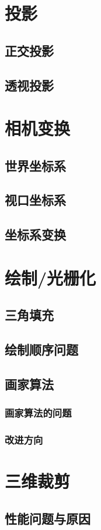 \documentclass[12pt,oneside,a4paper]{ctexart}
\begin{document}
\section{投影}
\subsection{正交投影}
\subsection{透视投影}
\section{相机变换}
\subsection{世界坐标系}
\subsection{视口坐标系}
\subsection{坐标系变换}
\section{绘制/光栅化}
\subsection{三角填充}
\subsection{绘制顺序问题}
\subsection{画家算法}
\subsubsection{画家算法的问题}
\subsubsection{改进方向}
\section{三维裁剪}
\subsection{性能问题与原因}
\end{document}
